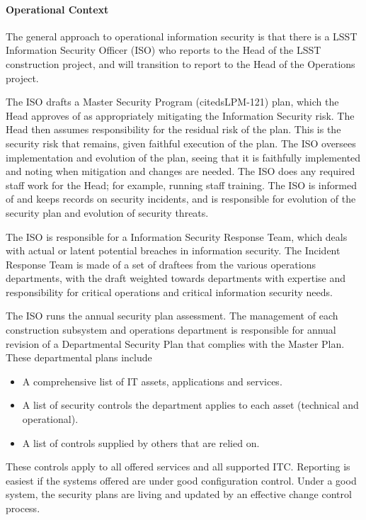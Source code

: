 \paragraph{Operational Context}

The general approach to operational information security is that there is a LSST
Information Security Officer (ISO) who reports to the Head of the LSST
construction project, and will transition to report to the Head of the Operations
project.

The ISO drafts a Master Security Program (citeds{LPM-121}) plan, which the Head
approves of as appropriately mitigating the Information Security risk. The Head
then assumes responsibility for the residual risk of the plan. This is the
security risk that remains, given faithful execution of the plan. The ISO
oversees implementation and evolution of the plan, seeing that it is faithfully
implemented and noting when mitigation and changes are needed. The ISO does any
required staff work for the Head; for example, running staff training. The ISO
is informed of and keeps records on security incidents, and is responsible for
evolution of the security plan and evolution of security threats.

The ISO is responsible for a Information Security Response Team, which deals
with actual or latent potential breaches in information security. The Incident
Response Team is made of a set of draftees from the various operations
departments, with the draft weighted towards departments with expertise and
responsibility for critical operations and critical information security needs.

 The ISO runs the annual security plan assessment. The management of each
 construction subsystem and operations department is responsible for annual
 revision of a Departmental Security Plan that complies with the Master Plan.
 These departmental plans include

\begin{itemize}
\item A comprehensive list of IT assets, applications and services.
\item A list of security controls the department applies to each asset
(technical and operational).
\item A list of controls supplied by others that are relied on.
\end{itemize}

These controls apply to all offered services and all supported ITC. Reporting
is easiest if the systems offered are under good configuration control. Under a
good system, the security plans are living and updated by an effective change
control process.

